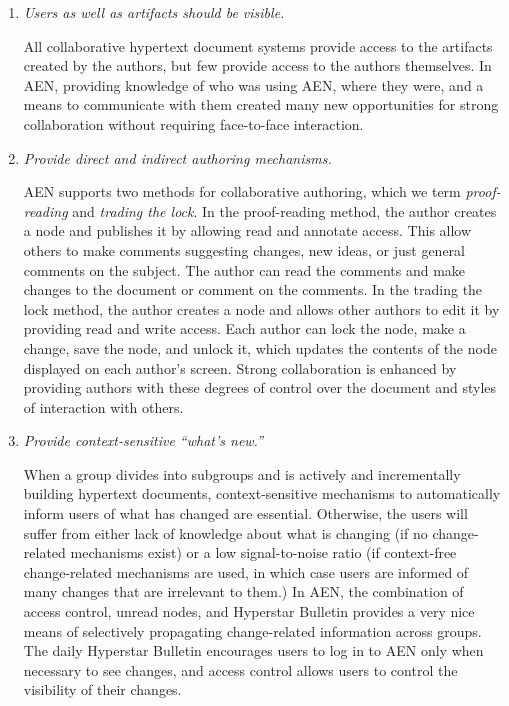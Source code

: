 \begin{enumerate}

\item {\em Users as well as artifacts should be visible.}

  All collaborative hypertext document systems provide access to the artifacts
  created by the authors, but few provide access to the authors
  themselves.  In AEN, providing knowledge of who was using AEN, where
  they were, and a means to communicate with them created many new
  opportunities for strong collaboration without requiring face-to-face
  interaction.
  

\item {\em Provide direct and indirect authoring mechanisms.}

  AEN supports two methods for collaborative authoring, which we term
  {\em proof-reading} and {\em trading the lock}.  In the proof-reading
  method, the author creates a node and publishes it by allowing read and
  annotate access.  This allow others to make comments suggesting
  changes, new ideas, or just general comments on the subject.  The
  author can read the comments and make changes to the document or
  comment on the comments.
  In the trading the lock method, the author creates a node and allows
  other authors to edit it by providing read and write access.  Each
  author can lock the node, make a change, save the node, and unlock it,
  which updates the contents of the node displayed on each author's
  screen.   Strong collaboration is enhanced by providing authors with
  these degrees of control over the document and styles of
  interaction with others. 

\item {\em Provide context-sensitive ``what's new.''}

  When a group divides into subgroups and is actively and incrementally
  building hypertext documents, context-sensitive mechanisms to
  automatically inform users of what has changed are
  essential. Otherwise, the users will suffer from either lack of
  knowledge about what is changing (if no change-related mechanisms
  exist) or a low signal-to-noise ratio (if context-free change-related
  mechanisms are used, in which case users are informed of many changes
  that are irrelevant to them.)  In AEN, the combination of access
  control, unread nodes, and Hyperstar Bulletin provides a very nice
  means of selectively propagating change-related information across
  groups.  The daily Hyperstar Bulletin encourages users to log in to AEN
  only when necessary to see changes, and access control allows users to
  control the visibility of their changes.


\end{enumerate}
